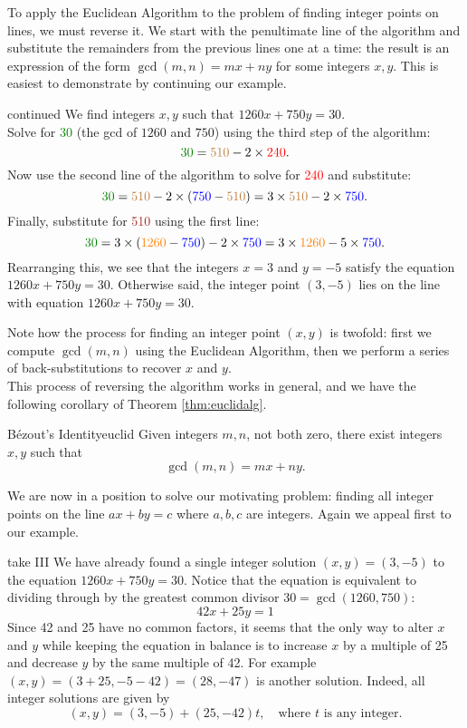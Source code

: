 To apply the Euclidean Algorithm to the problem of finding integer points on lines, we must reverse it. We start with the penultimate line of the algorithm and substitute the remainders from the previous lines one at a time: the result is an expression of the form $\gcd(m,n)=mx+ny$ for some integers $x,y$. This is easiest to demonstrate by continuing our example.

\begin{example}{continued}{}
We find integers $x,y$ such that $1260x+750y=30$.\\[5pt]
Solve for \textcolor{Green}{30} (the gcd of $1260$ and $750$) using the third step of the algorithm:
\[\textcolor{Green}{30}=\textcolor{brown}{510}-2\times\textcolor{red}{240}.\]
Now use the second line of the algorithm to solve for \textcolor{red}{240} and substitute:
\[\textcolor{Green}{30}=\textcolor{brown}{510}-2\times (\textcolor{blue}{750}-\textcolor{brown}{510})=3\times \textcolor{brown}{510}-2\times \textcolor{blue}{750}.\]
Finally, substitute for \textcolor{brown}{510} using the first line:
\[\textcolor{Green}{30}=3\times (\textcolor{orange}{1260}-\textcolor{blue}{750})-2\times \textcolor{blue}{750}=3\times \textcolor{orange}{1260}-5\times \textcolor{blue}{750}.\]
Rearranging this, we see that the integers $x=3$ and $y=-5$ satisfy the equation $1260x+750y=30$. Otherwise said, the integer point $(3,-5)$ lies on the line with equation $1260x+750y=30$.
\end{example}

 Note how the process for finding an integer point $(x,y)$ is twofold: first we compute $\gcd(m,n)$ using the Euclidean Algorithm, then we perform a series of back-substitutions to recover $x$ and $y$.\\

 This process of reversing the algorithm works in general, and we have the following corollary of Theorem \ref{thm:euclidalg}.

\begin{cor}{Bézout's Identity}{euclid}
Given integers $m,n$, not both zero, there exist integers $x,y$ such that
\[\gcd(m,n)=mx+ny.\]
\end{cor}

We are now in a position to solve our motivating problem: finding all integer points on the line $ax+by=c$ where $a,b,c$ are integers. Again we appeal first to our example.

\begin{example}{take III}{}
We have already found a single integer solution $(x,y)=(3,-5)$ to the equation $1260x+750y=30$. Notice that the equation is equivalent to dividing through by the greatest common divisor $30=\gcd(1260,750)$:
\[42x+25y=1\]
Since 42 and 25 have no common factors, it seems that the only way to alter $x$ and $y$ while keeping the equation in balance is to increase $x$ by a multiple of 25 and decrease $y$ by the same multiple of 42. For example $(x,y)=(3+25,-5-42)=(28,-47)$ is another solution. Indeed, all integer solutions are given by
\[(x,y)=(3,-5)+(25,-42)t,\quad\text{where $t$ is any integer.}\]
\end{example}

